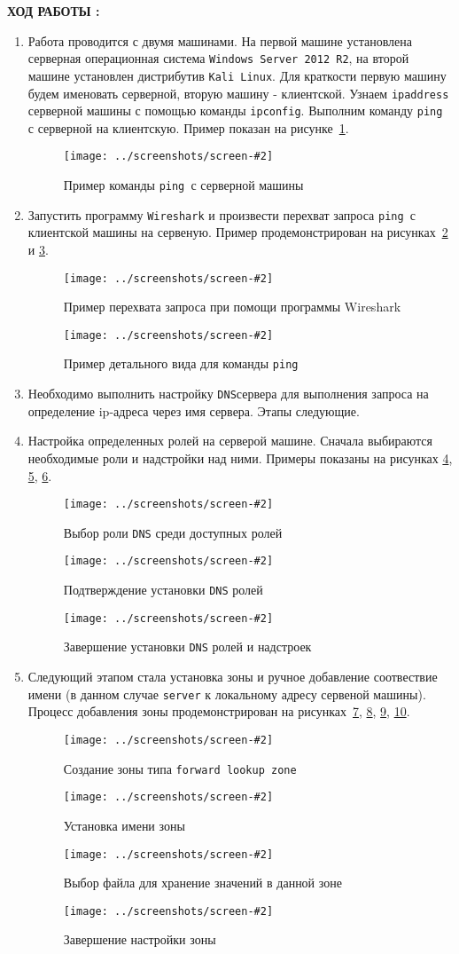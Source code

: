 \documentclass[14pt,a4paper]{extreport}
\newcommand{\screenshot}[2]{\begin{figure}[ht]%
\centering\texttt{[image: ../screenshots/screen-\#2]}%
\caption{\protect #1}%
\label{picture#2}%
\end{figure}%
}
\newcommand{\ping}{\texttt{ping }}
\newcommand{\dns}{\texttt{DNS}}
\begin{document}
\clearpage

\begin{center}
\textbf{\MakeUppercase{ход работы :}}
\end{center}

\begin{enumerate}

\item Работа проводится с двумя машинами. На первой машине установлена серверная операционная система \verb|Windows Server 2012 R2|, на второй машине установлен дистрибутив \verb|Kali Linux|. Для краткости первую машину будем именовать серверной, вторую машину - клиентской. Узнаем \verb|ipaddress| серверной машины с помощью команды \verb|ipconfig|. Выполним команду \ping с серверной на клиентскую. Пример показан на рисунке~\ref{picture1}.

\screenshot{Пример команды \ping с серверной машины}{1}

\item Запустить программу \texttt{Wireshark} и произвести перехват запроса \ping с клиентской машины на сервеную. Пример продемонстрирован на рисунках~\ref{picture2} и \ref{picture3}.

\screenshot{Пример перехвата запроса при помощи программы Wireshark}{2}

\screenshot{Пример детального вида для команды \ping}{3}

\item Необходимо выполнить настройку \dns сервера для выполнения запроса на определение ip-адреса через имя сервера. Этапы следующие.

\item Настройка определенных ролей на серверой машине. Сначала выбираются необходимые роли и надстройки над ними. Примеры показаны на рисунках \ref{picture4}, \ref{picture5}, \ref{picture6}.

\screenshot{Выбор роли \dns {} среди доступных ролей}{4}
\screenshot{Подтверждение установки \dns {} ролей}{5}
\screenshot{Завершение установки \dns {} ролей и надстроек}{6}

\item Следующий этапом стала установка зоны и ручное добавление соотвествие имени (в данном случае \texttt{server} к локальному адресу сервеной машины). Процесс добавления зоны продемонстрирован на рисунках~\ref{picture7}, \ref{picture8}, \ref{picture9}, \ref{picture10}.

\screenshot{Создание зоны типа \texttt{forward lookup zone}}{7}
\screenshot{Установка имени зоны}{8}
\screenshot{Выбор файла для хранение значений в данной зоне}{9}
\screenshot{Завершение настройки зоны}{10}


\end{enumerate}
\end{document}
